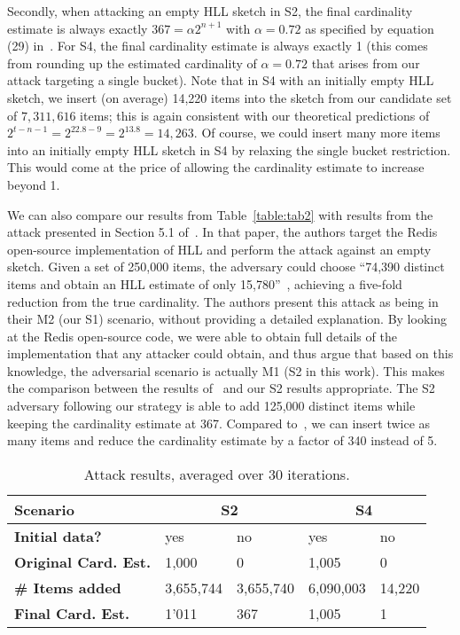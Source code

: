 \documentclass{IEEEtran}
\begin{document}
Secondly, when attacking an empty HLL sketch in S2, the final cardinality estimate is always exactly $367=\alpha2^{n+1}$ with $\alpha = 0.72$ as specified by equation (29) in~\cite{hll}. For S4, the final cardinality estimate is always exactly 1 (this comes from rounding up the estimated cardinality of $\alpha = 0.72$ that arises from our attack targeting a single bucket). Note that in S4 with an initially empty HLL sketch, we insert (on average) 14,220 items into the sketch from our candidate set of $7,311,616$ items; this is again consistent with our theoretical predictions of $2^{t-n-1} = 2^{22.8-9} = 2^{13.8} = 14,263$. Of course, we could insert many more items into an initially empty HLL sketch in S4 by relaxing the single bucket restriction. This would come at the price of allowing the cardinality estimate to increase beyond 1.

We can also compare our results from Table~\ref{table:tab2} with results from the attack presented in Section 5.1 of~\cite{hllvuln}. In that paper, the authors target the Redis~\cite{redis} open-source implementation of HLL and perform the attack against an empty sketch. Given a set of 250,000 items, the adversary could choose ``74,390 distinct items and obtain an HLL estimate of only 15,780''~\cite{hllvuln}, achieving a five-fold reduction from the true cardinality. The authors present this attack as being in their M2 (our S1) scenario, without providing a detailed explanation. By looking at the Redis open-source code, we were able to obtain full details of the implementation that any attacker could obtain, and thus argue that based on this knowledge, the adversarial scenario is actually M1 (S2 in this work). This makes the comparison between the results of~\cite{hllvuln} and our S2 results appropriate. The S2 adversary following our strategy is able to add 125,000 distinct items while keeping the cardinality estimate at 367. Compared to~\cite{hllvuln}, we can insert twice as many items and reduce the cardinality estimate by a factor of 340 instead of 5.

\begin{table}[h]
\caption{Attack results, averaged over 30 iterations.}
\begin{tabular}{| m{8.5em} | m{4em} | m{4em} | m{4em} | m{4em} |}
    \hline
    \textbf{Scenario} & \multicolumn{2}{c|}{S2} & \multicolumn{2}{c|}{S4} \\ \hline
    \textbf{Initial data?} & yes & no & yes & no \\ \hline
    \textbf{Original Card. Est.} & 1,000 & 0 & 1,005 & 0 \\ \hline
    \textbf{\# Items added} & 3,655,744 & 3,655,740 & 6,090,003 & 14,220 \\ \hline
    \textbf{Final Card. Est.} & 1'011 & 367 & 1,005 & 1 \\ \hline
\end{tabular}
\label{table:tab1}
\end{table}
\end{document}
